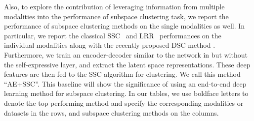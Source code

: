 \documentclass[journal]{IEEEtran}
\begin{document}
\begin{table}[t]
\begin{center}
\caption{Spatial fusion variations that are used in the experiments. } \label{tbl:spatialmethods}
\end{center}
\end{table}

Also, to explore the contribution of leveraging information from multiple modalities into the performance of subspace clustering task, we report the performance of  subspace clustering methods on the single modalities as well.   In particular, we report the classical SSC~\cite{SSC_PAMI} and LRR~\cite{LRR_PAMI_2013} performances on the individual modalities along with the recently proposed DSC method \cite{deepsc17nips}.  Furthermore, we train an encoder-decoder similar to the network in \cite{deepsc17nips} but without the self-expressive layer, and extract the latent space representations.  These deep features are then fed to the SSC algorithm for clustering.   We call this method ``AE+SSC''.  This baseline will show the significance of using an end-to-end deep learning method for subspace clustering. 
  In our tables, we use boldface letters to denote the top performing method and specify the corresponding modalities or datasets in the rows, and subspace clustering methods on the columns. \\
\end{document}
